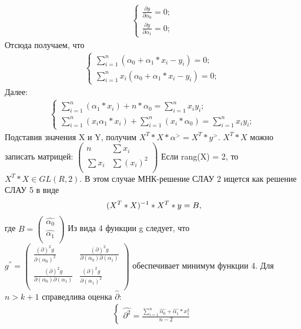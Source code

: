 \documentclass[__main__.tex]{subfiles}
\begin{document}
\begin{gather}
	\begin{cases}
		\frac{\partial y}{\partial  \alpha_0} = 0;\\
		\frac{\partial y}{\partial  \alpha_1} = 0;
	\end{cases}
\end{gather}
Отсюда получаем, что
\begin{gather}
	\begin{cases}
	 \sum_{i=1}^{n}(\alpha_0 + \alpha_1 * x_i - y_i) = 0;\\
	 \sum_{i=1}^{n} x_i (\alpha_0 + \alpha_1 * x_i - y_i) = 0;
	\end{cases}
\end{gather}
Далее:
\begin{gather}
	\begin{cases}
	\sum_{i=1}^{n}(\alpha_1 * x_i) + n*\alpha_0 = \sum_{i=1}^{n}x_i y_i;\\
	\sum_{i=1}^{n}(x_i   \alpha_1 * x_i) + \sum_{i=1}^{n}(x_i * \alpha_0) = \sum_{i=1}^{n} x_i y_i;
\end{cases}
\end{gather}
Подставив значения X и Y, получим $X^{T}*X*\alpha^{>} = X^{T}*y^{>}$. $X^{T}*X$ можно записать матрицей:
 $\left(
\begin{matrix}
n & \sum x_i\\
\sum x_i  & \sum (x_i)^2\\
\end{matrix}
\right)$
Если rang(X) = 2, то $X^{T}*X \in GL(R,2)$. В этом случае МНК-решение СЛАУ 2 ищется как решение СЛАУ 5 в виде 
\begin{equation}
\ (X^{T}*X)^{-1} *X^{T}*y  = B,
\llabel{eq:6}
\end{equation}
где $B = \left(
\begin{matrix}
\hat{\alpha_0} \\
\hat{\alpha_1}\\
\end{matrix}
\right)$
Из вида 4 функции g следует, что $g^{''} = \left(
\begin{matrix}
\frac{(\partial)^2 g}{\partial  (\alpha_0)^2} & \frac{(\partial)^2 g}{\partial(\alpha_0)\partial (\alpha_1)} \\
\frac{(\partial)^2 g}{\partial(\alpha_0)\partial (\alpha_1)} & \frac{(\partial)^2 g}{\partial  (\alpha_1)^2}\\
\end{matrix}
\right)$ обеспечивает минимум функции 4.
Для $n > k+1$ справедлива оценка $\hat{\partial}$:
 \begin{gather}
 	\begin{cases}
 		\hat{\partial^2} = \frac{\sum_{i=1}^{n}\hat{\alpha_0} + \hat{\alpha_1}*x_1^2}{n-2}
 	\end{cases}
 \end{gather}
\end{document}
